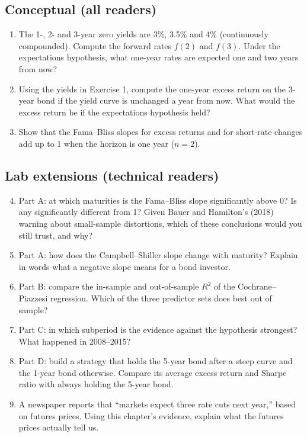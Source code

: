\subsection*{Conceptual (all readers)}

\begin{enumerate}
  \item The 1-, 2- and 3-year zero yields are 3\%, 3.5\% and 4\% (continuously compounded). Compute the forward rates $f(2)$ and $f(3)$. Under the expectations hypothesis, what one-year rates are expected one and two years from now?
  \item Using the yields in Exercise 1, compute the one-year excess return on the 3-year bond if the yield curve is unchanged a year from now. What would the excess return be if the expectations hypothesis held?
  \item Show that the Fama--Bliss slopes for excess returns and for short-rate changes add up to 1 when the horizon is one year ($n = 2$).
\end{enumerate}

\subsection*{Lab extensions (technical readers)}

\begin{enumerate}
  \setcounter{enumi}{3}
  \item Part A: at which maturities is the Fama--Bliss slope significantly above 0? Is any significantly different from 1? Given Bauer and Hamilton's (2018) warning about small-sample distortions, which of these conclusions would you still trust, and why?
  \item Part A: how does the Campbell--Shiller slope change with maturity? Explain in words what a negative slope means for a bond investor.
  \item Part B: compare the in-sample and out-of-sample $R^2$ of the Cochrane--Piazzesi regression. Which of the three predictor sets does best out of sample?
  \item Part C: in which subperiod is the evidence against the hypothesis strongest? What happened in 2008--2015?
  \item Part D: build a strategy that holds the 5-year bond after a steep curve and the 1-year bond otherwise. Compare its average excess return and Sharpe ratio with always holding the 5-year bond.
  \item A newspaper reports that ``markets expect three rate cuts next year,'' based on futures prices. Using this chapter's evidence, explain what the futures prices actually tell us.
\end{enumerate}

